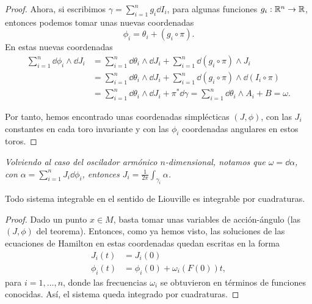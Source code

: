 \begin{proof}
Ahora, si escribimos $\gamma= \sum_{i=1}^n g_i \dd I_i$, para algunas funciones $g_i:\mathbb{R}^n \rightarrow \mathbb{R}$, entonces podemos tomar unas nuevas coordenadas 
\[
  \phi_i= \theta_i + (g_i \circ \pi).
\]
En estas nuevas coordenadas
\[
\begin{split}
  \sum_{i=1}^n \dd \phi_i \wedge \dd J_i & = \sum_{i=1}^n \dd \theta_i \wedge \dd J_i + \sum_{i=1}^n \dd(g_i \circ \pi) \wedge J_i \\
   & =\sum_{i=1}^n \dd \theta_i \wedge \dd J_i + \sum_{i=1}^n \dd(g_i \circ \pi) \wedge \dd (I_i \circ \pi) \\
   & =\sum_{i=1}^n \dd \theta_i \wedge \dd J_i + \pi^* \dd \gamma = \sum_{i=1}^n \dd \theta_i \wedge A_i + B = \omega.
\end{split}
\]

Por tanto, hemos encontrado unas coordenadas simplécticas $(J,\phi)$, con las $J_i$ constantes en cada toro invariante y con las $\phi_i$ coordenadas angulares en estos toros.
\end{proof}

\begin{obs}
  \em
  Volviendo al caso del oscilador armónico $n$-dimensional, notamos que $\omega=\dd \alpha$, con $\alpha=\sum_{i=1}^n J_i \dd \phi_i$, entonces $J_i=\frac{1}{2\pi}\int_{\gamma_i}\alpha$.
\end{obs}

\begin{corol}
  Todo sistema integrable en el sentido de Liouville es integrable por cuadraturas.
\end{corol}

\begin{proof}
  Dado un punto $x \in M$, basta tomar unas variables de acción-ángulo (las $(J,\phi)$ del teorema). Entonces, como ya hemos visto, las soluciones de las ecuaciones de Hamilton en estas coordenadas quedan escritas en la forma
  \begin{align*}
    J_i(t) & = J_i (0) \\
    \phi_i(t) & = \phi_i(0) + \omega_i(F(0))t,
  \end{align*}
  para $i=1,\dots,n$, donde las frecuencias $\omega_i$ se obtuvieron en términos de funciones conocidas. Así, el sistema queda integrado por cuadraturas.
\end{proof}



